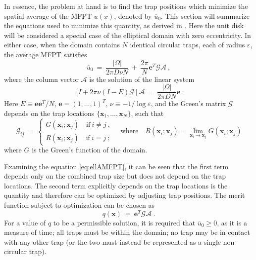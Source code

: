 \documentclass[11pt,letter,subeqn,fleqn]{article}
\newcommand{\ps}{\ + \ }
\newcommand{\es}{\ = \ }
\newcommand{\amfpt}{\overline{u}_0} %
\newcommand{\veps}{\varepsilon}     %
\newcommand{\greenMat}{\mathcal{G}} %
\newcommand{\vecA}{\mathcal{A}}     %
\newcommand{\vecE}{\textbf{e}}      %
\newcommand{\trapLoc}{\mathbf{x}}   %
\newcommand{\domMeas}{|\Omega|}     %
\newcommand{\meritFunc}{q}          %
\begin{document}
In essence, the problem at hand is to find the trap positions which minimize the spatial average of the MFPT $u(x)$, denoted by $\amfpt$. This section will summarize the equations used to minimize this quantity, as derived in \cite{kolokolnikov2005optimizing, iyaniwura2020optimization}. Here the unit disk will be considered a special case of the elliptical domain with zero eccentricity. In either case, when the domain contains $N$ identical circular traps, each of radius $\veps$, the average MFPT satisfies \cite{iyaniwura2020optimization}
\begin{equation} \label{eq:ellAMFPT}
\amfpt \es \dfrac{\domMeas}{2\pi D\nu N} \ps \dfrac{2\pi}{N}\vecE^{T}\greenMat \vecA \ ,
\end{equation}
where the column vector $\vecA$ is the solution of the linear system
\[
\left[ I + 2\pi\nu\left( I - E \right)\greenMat \right]\vecA \es \dfrac{\domMeas}{2\pi D N}\vecE \ .
\]
Here $E \equiv \vecE\vecE^{T}/N$, $\vecE = (1, \ldots, 1)^{T}$, $\nu \equiv -1/\log\veps$, and the Green's matrix $\greenMat$ depends on the trap locations $\lbrace \trapLoc_1, \ldots , \trapLoc_N \rbrace$, such that
\begin{equation} \label{eq:ellGmat}
\greenMat_{ij} \es \left\lbrace
\begin{array}{ll}
G(\trapLoc_i ; \trapLoc_j) \quad \text{if} \ i \neq j \ , \\[5pt]
R(\trapLoc_i ; \trapLoc_j) \quad \text{if} \ i = j  \ ;
\end{array}
\quad \text{where} \quad
R(\trapLoc_i ; \trapLoc_j) = \lim_{\trapLoc_i \to \trapLoc_j} G(\trapLoc_i ; \trapLoc_j)
\right.
\end{equation}
where $G$ is the Green's function of the domain.

Examining the equation \eqref{eq:ellAMFPT}, it can be seen that the first term depends only on the combined trap size but does not depend on the trap locations. The second term explicitly depends on the trap locations is the quantity and therefore can be optimized by adjusting trap positions. The merit function subject to optimization can be chosen as
\begin{equation} \label{eq:ellMerit}
\meritFunc\left( \trapLoc \right) \es \vecE^{T}\greenMat \vecA \ .
\end{equation}
For a value of $\meritFunc$ to be a permissible solution, it is required that $\amfpt \geq 0$, as it is a measure of time; all traps must be within the domain; no trap may be in contact with any other trap (or the two must instead be represented as a single non-circular trap).
\end{document}

